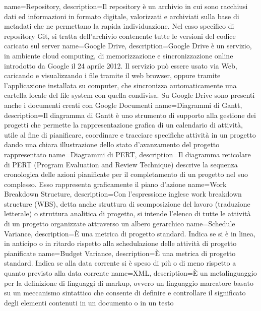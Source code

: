  {
	name=Repository,
	description={Il repository è un archivio in cui sono racchiusi dati ed informazioni in formato digitale, valorizzati e archiviati sulla base di metadati che ne permettano la rapida individuazione. 
		Nel caso specifico di repository Git, si tratta dell'archivio contenente tutte le versioni del codice caricato sul server}
}
 {
	name=Google Drive,
	description={Google Drive è un servizio, in ambiente cloud computing, di memorizzazione e sincronizzazione online introdotto da Google il 24 aprile 2012. 
		Il servizio può essere usato via Web, caricando e visualizzando i file tramite il web browser, oppure tramite l'applicazione installata su computer,  
		che sincronizza automaticamente una cartella locale del file system con quella condivisa. Su Google Drive sono presenti anche i documenti creati con Google Documenti}
}
 {
	name=Diagrammi di Gantt,
	description={Il diagramma di Gantt è uno strumento di supporto alla gestione dei progetti che permette la rappresentazione grafica di un calendario di attività, 
		utile al fine di pianificare, coordinare e tracciare specifiche attività in un progetto dando una chiara illustrazione dello stato d'avanzamento del progetto rappresentato}
}
 {
	name=Diagrammi di PERT,
	description={Il diagramma reticolare di PERT (Program Evaluation and Review Technique) descrive la sequenza cronologica delle azioni pianificate per il completamento di un progetto nel suo complesso. 
		Esso rappresenta graficamente il piano d'azione}
}
 {
	name=Work Breakdown Structure,
	description={Con l'espressione inglese work breakdown structure (WBS), detta anche struttura di scomposizione del lavoro (traduzione letterale) o struttura analitica di progetto, 
		si intende l'elenco di tutte le attività di un progetto organizzate attraverso un albero gerarchico}
}
 {
	name=Schedule Variance,
	description={È una metrica di progetto standard. Indica se si è in linea, in anticipo o in ritardo rispetto alla schedulazione delle attività di progetto pianificate}
}
 {
	name=Budget Variance,
	description={È una metrica di progetto standard. Indica se alla data corrente si è speso di più o di meno rispetto a quanto previsto alla data corrente}
}
 {
	name=XML,
	description={È un metalinguaggio per la definizione di linguaggi di markup, ovvero un linguaggio marcatore basato su un meccanismo sintattico che consente di definire e controllare il significato degli elementi contenuti in un documento o in un testo}
}
